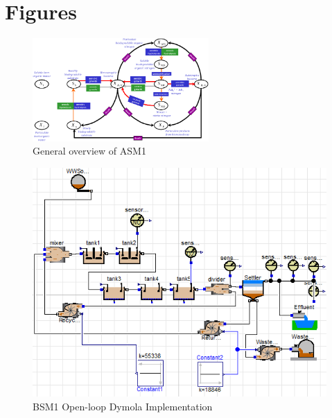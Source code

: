 \appendices
\onecolumn
\section{Figures}
\label{sec:AppendixA}
\begin{figure}[h]
    \centering
    \includegraphics[width=0.6\textwidth]{Report/Figures/asm1-overview.pdf}
    \caption{General overview of ASM1}
    \label{fig:ASM1-overview}
\end{figure}

\begin{figure}[h]
    \centering
    \includegraphics{Report/Figures/task1c.png}
    \caption{BSM1 Open-loop Dymola Implementation}
    \label{fig:openloop}
\end{figure}
\newpage

